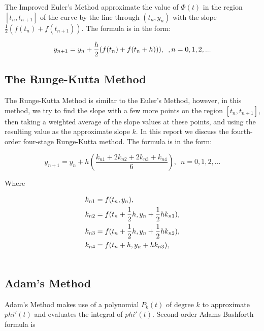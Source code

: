 \documentclass[a4paper]{article}
\begin{document}
	The Improved Euler’s Method approximate the value of $\Phi(t)$ in the region $[t_n, t_{n+1}]$ of the curve by the line through $(t_n, y_n)$ with the slope $\frac{1}{2} (f(t_n) + f(t_{n+1}))$. The formula is in the form:
	
	\begin{equation}\label{eq.3}
		y_{n+1} = y_n + {h \over 2}(f(t_n) + f(t_n + h))), \enspace, n = 0,1,2,...
	\end{equation}	
	
	
	\subsection{The Runge-Kutta Method}
	
	The Runge-Kutta Method is similar to the Euler’s Method, however, in this method, we try to find the slope with a few more points on the region $[t_n, t_{n+1}]$, then taking a weighted average of the slope values at these points, and using the resulting value as the approximate slope $k$.
	In this report we discuss the fourth-order four-stage Runge-Kutta method. The formula is in the form:
	
	\begin{equation}\label{eq.4}
		y_{n+1} = y_n + h(\frac{k_{n1} + 2k_{n2} + 2k_{n3} + k_{n4}}{6}), \enspace n = 0, 1, 2,...
	\end{equation}

	Where
	
	\begin{align} \nonumber
		k_{n1} &= f(t_n, y_n), \\ \nonumber
		k_{n2} &= f(t_n + {1 \over 2}h, y_n + {1 \over 2}hk_{n1}), \\ \nonumber
		k_{n3} &= f(t_n + {1 \over 2}h, y_n + {1 \over 2}hk_{n2}), \\ \nonumber
		k_{n4} &= f(t_n + h, y_n + hk_{n3}), \\ \nonumber
	\end{align}
	
	
	\subsection{Adam’s Method}
	
	Adam’s Method makes use of a polynomial $P_k(t)$ of degree $k$ to approximate $phi'(t)$ and evaluates the integral of $phi'(t)$.
	Second-order Adams-Bashforth formula is
	
\end{document}
